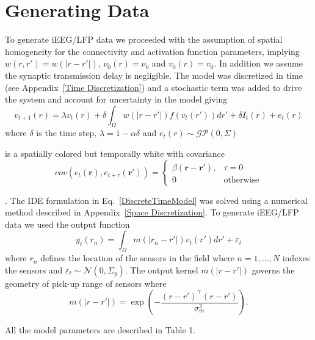\documentclass[onecolumn,draftcls]{IEEEtran}
\begin{document}
\section{Generating Data}
To generate iEEG/LFP data we proceeded with the assumption of spatial homogeneity for the connectivity and activation function parameters, implying $w(r,r') = w\left(|r-r'|\right)$, $\nu_0(r) = \nu_0$ and $v_0(r) = v_0$. In addition we assume the synaptic transmission delay is negligible. The model was discretized in time  (see Appendix~\ref{Time Discretization}) and a stochastic term was added to drive the system and account for uncertainty in the model giving
\begin{equation}\label{DiscreteTimeModel}
	v_{t+1}\left(r\right) = \lambda v_t\left(r\right) + \delta \int_\Omega { w\left(|r-r'|\right) f\left(v_t\left(r'\right)\right) dr'} + \delta I_t\left(r\right) + e_t\left(r\right)
\end{equation}
where $\delta$ is the time step, $\lambda = 1-\alpha\delta$ and $e_t(r) \sim \mathcal{GP}(0,\Sigma)$\begin{todo}{
is a spatially colored but temporally white with covariance
\begin{equation}
 cov(e_t(\mathbf{r}),e_{t+\tau}(\mathbf{r'}))=
\begin{cases}
\beta\left(\mathbf{r}-\mathbf{r'}\right), & \tau=0 \\
0 & \mathrm{otherwise}
\end{cases}
\label{eq:FieldCovariance}
\end{equation}}
\end{todo}. The IDE formulation in Eq.~\ref{DiscreteTimeModel} was solved using a numerical method described in Appendix~\ref{Space Discretization}. To generate iEEG/LFP data we used the output function 
\begin{equation}
	y_t(r_n) = \int_{\Omega}{m\left(|r_n-r'|\right)v_t\left(r'\right)dr'} + \varepsilon_t
\end{equation}
where $r_n$ defines the location of the sensors in the field where $n=1,...,N$ indexes the sensors and $\varepsilon_t \sim \mathcal{N}\left(0,\Sigma_y\right)$. The output kernel $m(|r-r'|)$ governs the geometry of pick-up range of sensors where
\begin{equation}
	m\left(|r-r'|\right) = \exp{\left(-\frac{(r-r')^\top(r-r')}{\sigma_m^2}\right)}.
\end{equation}

All the model parameters are described in Table 1.
\end{document}
